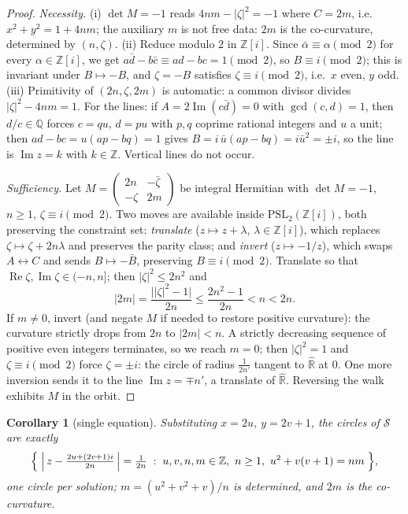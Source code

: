 \documentclass[11pt]{amsart}
\numberwithin{equation}{section}
\theoremstyle{plain}
\newtheorem{corollary}[theorem]{Corollary}
\theoremstyle{definition}
\theoremstyle{remark}
\newcommand{\R}{\mathbb{R}}
\newcommand{\Q}{\mathbb{Q}}
\newcommand{\Z}{\mathbb{Z}}
\newcommand{\Zi}{\Z[i]}
\newcommand{\Rhat}{\widehat{\R}}
\newcommand{\PSL}{\mathrm{PSL}}
\newcommand{\im}{\operatorname{Im}}
\newcommand{\re}{\operatorname{Re}}
\newcommand{\Sarr}{\mathcal{S}}
\begin{document}
\begin{proof}
\emph{Necessity.}  (i) $\det M = -1$ reads $4nm - |\zeta|^2 = -1$ where
$C = 2m$, i.e.\ $x^2 + y^2 = 1 + 4nm$; the auxiliary $m$ is not free data:
$2m$ is the co-curvature, determined by $(n, \zeta)$.
(ii) Reduce modulo $2$ in $\Zi$.  Since $\bar\alpha \equiv \alpha \pmod 2$
for every $\alpha \in \Zi$, we get
$a\bar d - b\bar c \equiv ad - bc = 1 \pmod 2$, so
$B \equiv i \pmod 2$; this is invariant under $B \mapsto -B$, and
$\zeta = -B$ satisfies $\zeta \equiv i \pmod 2$, i.e.\ $x$ even, $y$ odd.
(iii) Primitivity of $(2n, \zeta, 2m)$ is automatic: a common divisor
divides $|\zeta|^2 - 4nm = 1$.
For the lines: if $A = 2\im(c\bar d) = 0$ with $\gcd(c, d) = 1$, then
$d/c \in \Q$ forces $c = qu$, $d = pu$ with $p, q$ coprime rational
integers and $u$ a unit; then $ad - bc = u(ap - bq) = 1$ gives
$B = i\,\bar u(ap - bq) = i\bar u^2 = \pm i$, so the line is
$\im z = k$ with $k \in \Z$.  Vertical lines do not occur.

\emph{Sufficiency.}  Let
$M = \begin{pmatrix} 2n & -\bar\zeta \\ -\zeta & 2m\end{pmatrix}$ be
integral Hermitian with $\det M = -1$, $n \ge 1$, $\zeta \equiv i
\pmod 2$.  Two moves are available inside $\PSL_2(\Zi)$, both preserving
the constraint set: \emph{translate} ($z \mapsto z + \lambda$,
$\lambda \in \Zi$), which replaces $\zeta \mapsto \zeta + 2n\lambda$ and
preserves the parity class; and \emph{invert} ($z \mapsto -1/z$), which
swaps $A \leftrightarrow C$ and sends $B \mapsto -\bar B$, preserving
$B \equiv i \pmod 2$.  Translate so that
$\re \zeta, \im\zeta \in (-n, n]$; then $|\zeta|^2 \le 2n^2$ and
\[
  |2m| = \frac{\bigl||\zeta|^2 - 1\bigr|}{2n}
  \le \frac{2n^2 - 1}{2n} < n < 2n .
\]
If $m \neq 0$, invert (and negate $M$ if needed to restore positive
curvature): the curvature strictly drops from $2n$ to $|2m| < n$.  A
strictly decreasing sequence of positive even integers terminates, so we
reach $m = 0$; then $|\zeta|^2 = 1$ and $\zeta \equiv i \pmod 2$ force
$\zeta = \pm i$: the circle of radius $\tfrac1{2n'}$ tangent to $\Rhat$
at $0$.  One more inversion sends it to the line $\im z = \mp n'$, a
translate of $\Rhat$.  Reversing the walk exhibits $M$ in the orbit.
\end{proof}

\begin{corollary}[single equation]\label{cor:singleequation}
Substituting $x = 2u$, $y = 2v + 1$, the circles of $\Sarr$ are exactly
\[
  \Bigl\{\; \Bigl|\,z - \tfrac{2u + (2v+1)i}{2n}\,\Bigr| = \tfrac{1}{2n}
  \;:\; u, v, n, m \in \Z, \ n \ge 1, \ u^2 + v(v+1) = nm \;\Bigr\},
\]
one circle per solution; $m = (u^2 + v^2 + v)/n$ is determined, and $2m$
is the co-curvature.
\end{corollary}
\end{document}
